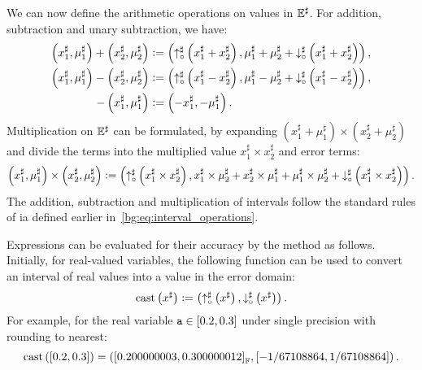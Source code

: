 We can now define the arithmetic operations on values in $\mathbb{E}^\sharp$.  For
addition, subtraction and unary subtraction, we have:
\begin{equation}
    \begin{aligned}
    \left( x^\sharp_1, \mu^\sharp_1 \right) +
    \left( x^\sharp_2, \mu^\sharp_2 \right)
    &\vcentcolon=
        \left(
            \operatorname{\uparrow^\sharp_\circ}\left(x^\sharp_1 + x^\sharp_2\right),
            \mu^\sharp_1 + \mu^\sharp_2 +
            \operatorname{\downarrow^\sharp_\circ}\left(x^\sharp_1 + x^\sharp_2\right)
        \right), \\
    \left( x^\sharp_1, \mu^\sharp_1 \right) -
    \left( x^\sharp_2, \mu^\sharp_2 \right)
    &\vcentcolon=
        \left(
            \operatorname{\uparrow^\sharp_\circ}\left(x^\sharp_1 - x^\sharp_2\right),
            \mu^\sharp_1 - \mu^\sharp_2 +
            \operatorname{\downarrow^\sharp_\circ}\left(x^\sharp_1 - x^\sharp_2\right)
        \right), \\
    -\left( x^\sharp_1, \mu^\sharp_1 \right)
    &\vcentcolon=
        \left( -x^\sharp_1, -\mu^\sharp_1 \right).
    \end{aligned}
    \label{bg:eq:error_arithmetic}
\end{equation}
Multiplication on $\mathbb{E}^\sharp$ can be formulated, by expanding $\left(
x^\sharp_1 + \mu^\sharp_1 \right) \times \left( x^\sharp_2 + \mu^\sharp_2
\right)$ and divide the terms into the multiplied value $x^\sharp_1 \times
x^\sharp_2$ and error terms:
\begin{equation}
    \left( x^\sharp_1, \mu^\sharp_1 \right) \times
    \left( x^\sharp_2, \mu^\sharp_2 \right)
    \vcentcolon=
        \left(
            \operatorname{\uparrow^\sharp_\circ}\left(x^\sharp_1 \times x^\sharp_2\right),
            x^\sharp_1 \times \mu^\sharp_2 + x^\sharp_2 \times \mu^\sharp_1 +
            \mu^\sharp_1 \times \mu^\sharp_2 +
            \operatorname{\downarrow^\sharp_\circ}\left(x^\sharp_1 \times x^\sharp_2\right)
        \right).
    \label{bg:eq:error_arithmetic_mult}
\end{equation}
The addition, subtraction and multiplication of intervals follow the standard
rules of \gls{ia} defined earlier in~\eqref{bg:eq:interval_operations}.

Expressions can be evaluated for their accuracy by the method as follows.
Initially, for real-valued variables, the following function can be used to
convert an interval of real values into a value in the error domain:
\begin{equation}
    \mathrm{cast}\left(x^\sharp\right) \vcentcolon= \left(
        \operatorname{\uparrow^\sharp_\circ}\left(x^\sharp\right), \operatorname{\downarrow^\sharp_\circ}\left(x^\sharp\right)
    \right).
    \label{bg:eq:cast}
\end{equation}
For example, for the real variable $\texttt{a} \in [0.2, 0.3]$ under single
precision with rounding to nearest:
\begin{equation}
    \mathrm{cast}\left([0.2, 0.3]\right) = \left(
        {\left[0.200000003, 0.300000012\right]}_\mathbb{F},
        \left[-1/67108864, 1/67108864\right]
    \right).
\end{equation}

